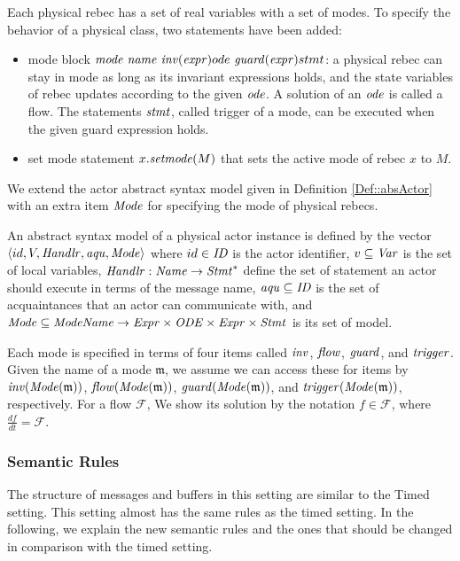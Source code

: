 Each physical rebec has a set of real variables with a set of modes. To specify the behavior of a physical class, two statements have been added: 
\begin{itemize}
    \item mode block ${\it mode}~ {\it name}~ {\it inv}({\it expr}){ode}~{\it guard}({\it expr}){stmt}$: a physical rebec can stay in mode as long as its invariant expressions holds, and the state variables of rebec updates according to the given $\it ode$. A solution of an $\it ode$ is called a flow. The statements $\it stmt$, called trigger of a mode, can be executed when the given guard expression holds.  
    \item set mode statement $x.{\it setmode}(M)$ that sets the active mode of rebec $x$ to $M$.
\end{itemize}
We extend the actor abstract syntax model given in Definition \ref{Def::absActor} with an extra item ${\it Mode}$ for specifying the mode of physical rebecs. 

\begin{defn}\label{Def::absPhyActor}
An abstract syntax model of a physical actor instance is defined by the vector $\langle id, V,\mathit{Handlr},\mathit{aqu}, {\it Mode}\rangle $ where $id\in \mathit{ID}$ is the actor identifier, $v\subseteq \mathit{Var}$ is the set of local variables, $\mathit{Handlr} : \mathit{Name} \rightarrow \mathit{Stmt}^*$ define the set of statement an actor should execute in terms of the message name, $\mathit{aqu}\subseteq \mathit{ID}$ is the set of acquaintances that an actor can communicate with, and $\mathit{Mode}\subseteq \mathit{ModeName}\rightarrow \mathit{Expr}\times \mathit{ODE} \times \mathit{Expr} \times \mathit{Stmt}$ is its set of model.
\end{defn}

Each mode is specified in terms of four items called ${\it inv}$, ${\it flow}$, ${\it guard}$, and ${\it trigger}$. Given the name of a mode $\mathfrak{m}$, we assume we can access these for items by $\mathit{inv}(\mathit{Mode}(\mathfrak{m}))$, $\mathit{flow}(\mathit{Mode}(\mathfrak{m}))$, $\mathit{guard}(\mathit{Mode}(\mathfrak{m}))$, and $\mathit{trigger}(\mathit{Mode}(\mathfrak{m}))$, respectively. For a flow $\mathcal{F}$, We show its solution by the notation $f\in\mathcal{F}$, where $\frac{df}{dt}=\mathcal{F}$. 

\subsubsection{Semantic Rules}
The structure of messages and buffers in this setting are similar to the Timed setting. This setting almost has the same rules as the timed setting. In the following, we explain the new semantic rules and the ones that should be changed in comparison with the timed setting.  


